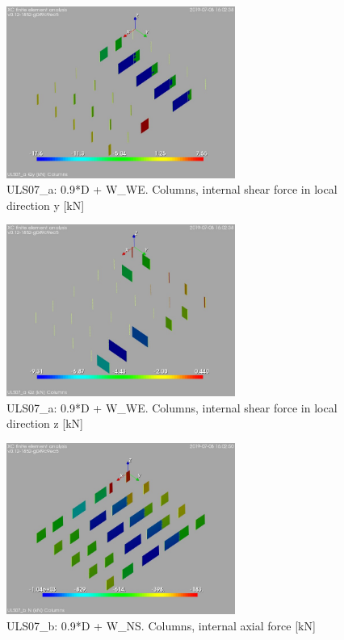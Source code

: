 \begin{figure}
\begin{center}
\includegraphics[width=75mm]{annex_res_columns/graphics/resSimplLC/ULS07_acolumnsQy}
\caption{ULS07\_a: 0.9*D + W\_WE. Columns, internal shear force in local direction y [kN]}
\end{center}
\end{figure}
\begin{figure}
\begin{center}
\includegraphics[width=75mm]{annex_res_columns/graphics/resSimplLC/ULS07_acolumnsQz}
\caption{ULS07\_a: 0.9*D + W\_WE. Columns, internal shear force in local direction z [kN]}
\end{center}
\end{figure}
\begin{figure}
\begin{center}
\includegraphics[width=75mm]{annex_res_columns/graphics/resSimplLC/ULS07_bcolumnsN}
\caption{ULS07\_b: 0.9*D + W\_NS. Columns, internal axial force [kN]}
\end{center}
\end{figure}

